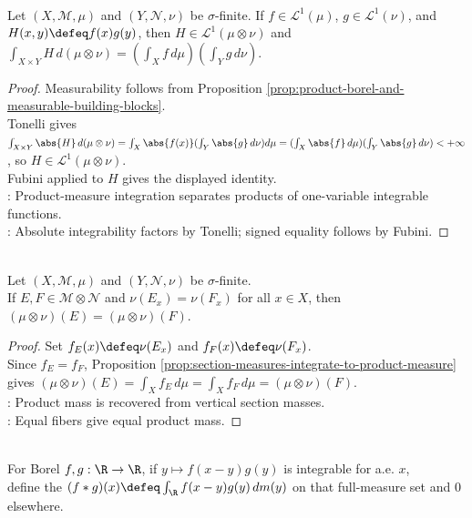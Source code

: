 \begin{proposition} \label{prop:integrable-separated-products} \\
Let $(X,\mathcal{M},\mu)$ and $(Y,\mathcal{N},\nu)$ be $\sigma$-finite. If $f\in\mathscr{L}^1(\mu)$, $g\in\mathscr{L}^1(\nu)$, and $H(x,y)\defeq f(x)g(y)$, then $H\in\mathscr{L}^1(\mu\otimes\nu)$ and $\int_{X\times Y}H\,d(\mu\otimes\nu)=(\int_Xf\,d\mu)(\int_Yg\,d\nu)$.
\begin{proof}
Measurability follows from Proposition \ref{prop:product-borel-and-measurable-building-blocks}.\\
Tonelli gives $\int_{X\times Y}\abs{H}\,d(\mu\otimes\nu)=\int_X\abs{f(x)}(\int_Y\abs{g}\,d\nu)d\mu=(\int_X\abs{f}\,d\mu)(\int_Y\abs{g}\,d\nu)<+\infty$, so $H\in\mathscr{L}^1(\mu\otimes\nu)$.\\
Fubini applied to $H$ gives the displayed identity.\\
: Product-measure integration separates products of one-variable integrable functions.\\
: Absolute integrability factors by Tonelli; signed equality follows by Fubini.
\end{proof}
\end{proposition}

\begin{corollary} \label{cor:equal-section-measures-equal-product-measure} \\
Let $(X,\mathcal{M},\mu)$ and $(Y,\mathcal{N},\nu)$ be $\sigma$-finite.\\
If $E,F\in\mathcal{M}\otimes\mathcal{N}$ and $\nu(E_x)=\nu(F_x)$ for all $x\in X$, then $(\mu\otimes\nu)(E)=(\mu\otimes\nu)(F)$.
\begin{proof}
Set $f_E(x)\defeq\nu(E_x)$ and $f_F(x)\defeq\nu(F_x)$.\\
Since $f_E=f_F$, Proposition \ref{prop:section-measures-integrate-to-product-measure} gives $(\mu\otimes\nu)(E)=\int_Xf_E\,d\mu=\int_Xf_F\,d\mu=(\mu\otimes\nu)(F)$.\\
: Product mass is recovered from vertical section masses.\\
: Equal fibers give equal product mass.
\end{proof}
\end{corollary}

\begin{definition} \label{def:convolution-real-line} \\
For Borel $f,g:\R\to\R$, if $y\mapsto f(x-y)g(y)$ is integrable for a.e. $x$,\\
define the  $(f*g)(x)\defeq\int_\R f(x-y)g(y)\,dm(y)$ on that full-measure set and $0$ elsewhere.
\end{definition}

